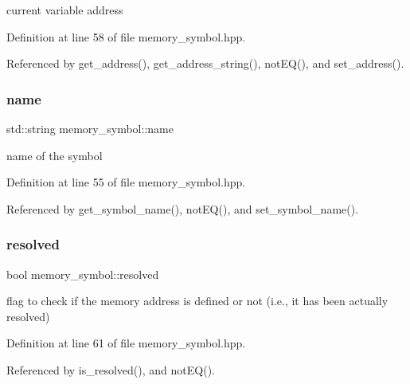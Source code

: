 current variable address 



Definition at line 58 of file memory\+\_\+symbol.\+hpp.



Referenced by get\+\_\+address(), get\+\_\+address\+\_\+string(), not\+E\+Q(), and set\+\_\+address().

\mbox{\label{classmemory__symbol_ae7444e39e5bb0fdf24f8779507c66833}} 
\subsubsection{\texorpdfstring{name}{name}}
{\footnotesize\ttfamily std\+::string memory\+\_\+symbol\+::name\hspace{0.3cm}{\ttfamily [private]}}



name of the symbol 



Definition at line 55 of file memory\+\_\+symbol.\+hpp.



Referenced by get\+\_\+symbol\+\_\+name(), not\+E\+Q(), and set\+\_\+symbol\+\_\+name().

\mbox{\label{classmemory__symbol_a8d8725be599300afbaf75eca99391514}} 
\subsubsection{\texorpdfstring{resolved}{resolved}}
{\footnotesize\ttfamily bool memory\+\_\+symbol\+::resolved\hspace{0.3cm}{\ttfamily [private]}}



flag to check if the memory address is defined or not (i.\+e., it has been actually resolved) 



Definition at line 61 of file memory\+\_\+symbol.\+hpp.



Referenced by is\+\_\+resolved(), and not\+E\+Q().

\mbox{\label{classmemory__symbol_ac829259b102b43c0736baf42205b743d}} 
